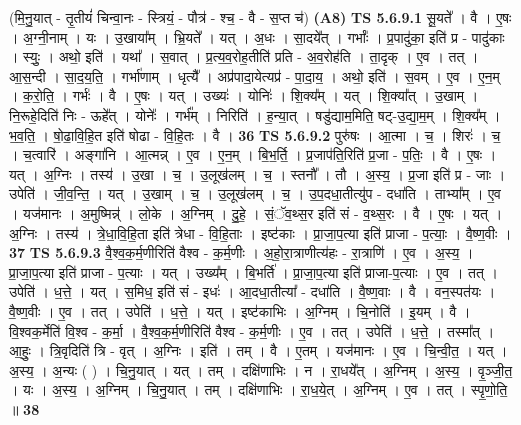 \documentclass[17pt]{extarticle}
\begin{document}
                      (मि॒नु॒यात् - तृ॒तीयं॑ चिन्वा॒नः - स्त्रियं॒ - पौत्र॑ - श्च॒ - वै - स॒प्त च॑)  \textbf{(A8)} \newline \newline
                                \textbf{ TS 5.6.9.1} \newline
                  सू॒यते᳚ । वै । ए॒षः । अ॒ग्नी॒नाम् । यः । उ॒खाया᳚म् । भ्रि॒यते᳚ । यत् । अ॒धः । सा॒दये᳚त् । गर्भाः᳚ । प्र॒पादु॑का॒ इति॑ प्र - पादु॑काः । स्युः॒ । अथो॒ इति॑ । यथा᳚ । स॒वात् । प्र॒त्य॒व॒रोह॒तीति॑ प्रति - अ॒व॒रोह॑ति । ता॒दृक् । ए॒व । तत् । आ॒स॒न्दी । सा॒द॒य॒ति॒ । गर्भा॑णाम् । धृत्यै᳚ । अप्र॑पादा॒येत्यप्र॑ - पा॒दा॒य॒ । अथो॒ इति॑ । स॒वम् । ए॒व । ए॒न॒म् । क॒रो॒ति॒ । गर्भः॑ । वै । ए॒षः । यत् । उख्यः॑ । योनिः॑ । शि॒क्य᳚म् । यत् । शि॒क्या᳚त् । उ॒खाम् । नि॒रूहे॒दिति॑ निः - ऊहे᳚त् । योनेः᳚ । गर्भ᳚म् । निरिति॑ । ह॒न्या॒त् । षडु॑द्याम॒मिति॒ षट्-उ॒द्या॒म॒म् । शि॒क्य᳚म् । भ॒व॒ति॒ । षो॒ढा॒वि॒हि॒त इति॑ षोढा - वि॒हि॒तः । वै । \textbf{  36} \newline
                  \newline
                                \textbf{ TS 5.6.9.2} \newline
                  पुरु॑षः । आ॒त्मा । च॒ । शिरः॑ । च॒ । च॒त्वारि॑ । अङ्गा॑नि । आ॒त्मन्न् । ए॒व । ए॒न॒म् । बि॒भ॒र्ति॒ । प्र॒जाप॑ति॒रिति॑ प्र॒जा - प॒तिः॒ । वै । ए॒षः । यत् । अ॒ग्निः । तस्य॑ । उ॒खा । च॒ । उ॒लूख॑लम् । च॒ । स्तनौ᳚ । तौ । अ॒स्य॒ । प्र॒जा इति॑ प्र - जाः । उपेति॑ । जी॒व॒न्ति॒ । यत् । उ॒खाम् । च॒ । उ॒लूख॑लम् । च॒ । उ॒प॒दधा॒तीत्यु॑प - दधा॑ति । ताभ्या᳚म् । ए॒व । यज॑मानः । अ॒मुष्मिन्न्॑ । लो॒के । अ॒ग्निम् । दु॒हे॒ । सं॒ॅव॒थ्स॒र इति॑ सं - व॒थ्स॒रः । वै । ए॒षः । यत् । अ॒ग्निः । तस्य॑ । त्रे॒धा॒वि॒हि॒ता इति॑ त्रेधा - वि॒हि॒ताः । इष्ट॑काः । प्रा॒जा॒प॒त्या इति॑ प्राजा - प॒त्याः॒ । वै॒ष्ण॒वीः । \textbf{  37} \newline
                  \newline
                                \textbf{ TS 5.6.9.3} \newline
                  वै॒श्व॒क॒र्म॒णीरिति॑ वैश्व - क॒र्म॒णीः । अ॒हो॒रा॒त्राणीत्य॑हः - रा॒त्राणि॑ । ए॒व । अ॒स्य॒ । प्रा॒जा॒प॒त्या इति॑ प्राजा - प॒त्याः । यत् । उख्य᳚म् । बि॒भर्ति॑ । प्रा॒जा॒प॒त्या इति॑ प्राजा-प॒त्याः । ए॒व । तत् । उपेति॑ । ध॒त्ते॒ । यत् । स॒मिध॒ इति॑ सं - इधः॑ । आ॒दधा॒तीत्या᳚ - दधा॑ति । वै॒ष्ण॒वाः । वै । वन॒स्पत॑यः । वै॒ष्ण॒वीः । ए॒व । तत् । उपेति॑ । ध॒त्ते॒ । यत् । इष्ट॑काभिः । अ॒ग्निम् । चि॒नोति॑ । इ॒यम् । वै । वि॒श्वक॒र्मेति॑ वि॒श्व - क॒र्मा॒ । वै॒श्व॒क॒र्म॒णीरिति॑ वैश्व - क॒र्म॒णीः । ए॒व । तत् । उपेति॑ । ध॒त्ते॒ । तस्मा᳚त् । आ॒हुः॒ । त्रि॒वृदिति॑ त्रि - वृत् । अ॒ग्निः । इति॑ । तम् । वै । ए॒तम् । यज॑मानः । ए॒व । चि॒न्वी॒त॒ । यत् । अ॒स्य॒ । अ॒न्यः ( ) । चि॒नु॒यात् । यत् । तम् । दक्षि॑णाभिः । न । रा॒धये᳚त् । अ॒ग्निम् । अ॒स्य॒ । वृ॒ञ्जी॒त॒ । यः । अ॒स्य॒ । अ॒ग्निम् । चि॒नु॒यात् । तम् । दक्षि॑णाभिः । रा॒ध॒ये॒त् । अ॒ग्निम् । ए॒व । तत् । स्पृ॒णो॒ति॒ ॥ \textbf{  38} \newline
\end{document}
